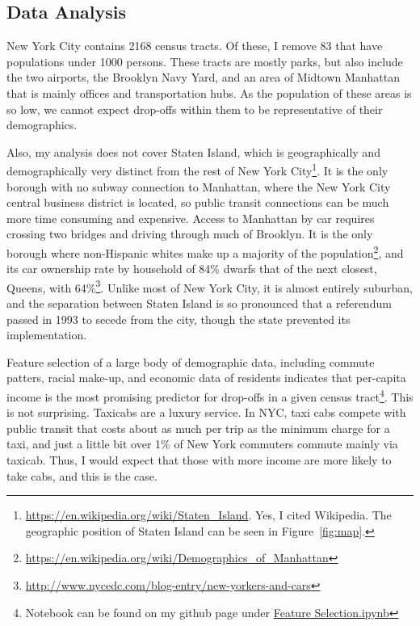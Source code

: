 \documentclass[11pt]{article}
\newcommand{\fref}[1]{Figure~\ref{fig:#1}}
\begin{document}

\subsection{Data Analysis}



New York City contains 2168 census tracts. 
Of these, I remove 83 that have populations under 1000 persons. These tracts are mostly parks, but also include the two airports, the Brooklyn Navy Yard, and an area of Midtown Manhattan that is mainly offices and transportation hubs.
As the population of these areas is so low, we cannot expect drop-offs within them to be representative of their demographics.

Also, my analysis does not cover Staten Island, which is geographically and demographically very distinct from the rest of New York City\footnote{\url{https://en.wikipedia.org/wiki/Staten_Island}. Yes, I cited Wikipedia. The geographic position of Staten Island can be seen in \fref{map}.}.
It is the only borough with no subway connection to Manhattan, where the New York City central business district is located, so public transit connections can be much more time consuming and expensive.
Access to Manhattan by car requires crossing two bridges and driving through much of Brooklyn.
It is the only borough where non-Hispanic whites make up a majority of the population\footnote{\url{https://en.wikipedia.org/wiki/Demographics_of_Manhattan}}, and its car ownership rate by household of 84\% dwarfs that of the next closest, Queens, with 64\%\footnote{\url{http://www.nycedc.com/blog-entry/new-yorkers-and-cars}}.
Unlike most of New York City, it is almost entirely suburban, and the separation between Staten Island is so pronounced that a referendum passed in 1993 to secede from the city, though the state prevented its implementation.

Feature selection of a large body of demographic data, including commute patters, racial make-up, and economic data of residents indicates that per-capita income is the most promising predictor for drop-offs in a given census tract\footnote{Notebook can be found on my github page under \href{https://github.com/ThomasProctor/Slide-Rule-Data-Intensive/blob/master/DataStory/FinalFiles/Feature\%20Selection.ipynb}{Feature Selection.ipynb}}. 
This is not surprising. Taxicabs are a luxury service. In NYC, taxi cabs compete with public transit that costs about as much per trip as the minimum charge for a taxi, and just a little bit over 1\% of New York commuters commute mainly via taxicab. 
Thus, I would expect that those with more income are more likely to take cabs, and this is the case. 
\end{document}
